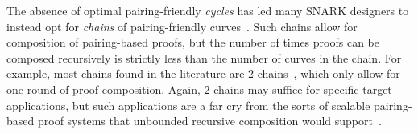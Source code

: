 \documentclass[version=preprint]{iacrcc}
\begin{document}
\begin{enumerate}
The absence of optimal pairing-friendly \emph{cycles} has led many SNARK designers to instead opt for \emph{chains} of pairing-friendly curves~\cite{gepetto,DBLP:conf/eurocrypt/HousniG22,AHG22}. Such chains allow for composition of pairing-based proofs, but the number of times proofs can be composed recursively is strictly less than the number of curves in the chain. For example, most chains found in the literature are 2-chains~\cite{ElHousni20,DBLP:conf/eurocrypt/HousniG22}, which only allow for one round of proof composition. Again, $2$-chains may suffice for specific target applications, but such applications are a far cry from the sorts of scalable pairing-based proof systems that unbounded recursive composition would support~\cite{scalable}. 

\end{enumerate}
\end{document}
